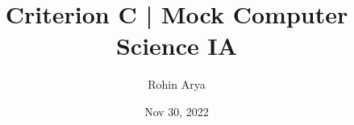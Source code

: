 \documentclass[titlepage]{article}
\title{Criterion C | Mock Computer Science IA}
\author{Rohin Arya}
\date{Nov 30, 2022}
\begin{document}
\maketitle
\tableofcontents
\pagebreak
\end{document}
